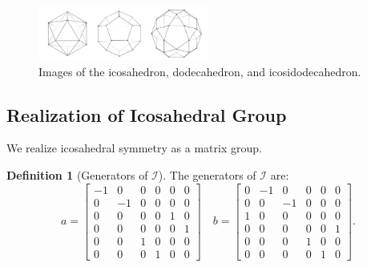 \documentclass[a4paper,10pt]{article}
\theoremstyle{plain}
\theoremstyle{definition}
\newtheorem{Definition}[Theorem]{Definition}
\theoremstyle{remark}
\begin{document}
\begin{figure}[h]
	\centering
	\captionsetup{width=0.5\textwidth}
	\includegraphics[width=0.5\textwidth]{images/ICO_DOD_IDD.jpg}
	\caption{Images of the icosahedron, dodecahedron, and icosidodecahedron.}
\end{figure}

\subsection{Realization of Icosahedral Group}
We realize icosahedral symmetry as a matrix group.
\begin{Definition}[Generators of \(\mathcal{I}\)]
    The generators of \(\mathcal{I}\) are:
    \[a = \begin{bmatrix}
    -1 & 0  & 0 & 0 & 0 & 0 \\
    0  & -1 & 0 & 0 & 0 & 0 \\
    0  & 0  & 0 & 0 & 1 & 0 \\
    0  & 0  & 0 & 0 & 0 & 1 \\
    0  & 0  & 1 & 0 & 0 & 0 \\
    0  & 0  & 0 & 1 & 0 & 0
\end{bmatrix} \quad b = \begin{bmatrix}
    0 & -1 & 0  & 0 & 0 & 0 \\
    0 & 0  & -1 & 0 & 0 & 0 \\
    1 & 0  & 0  & 0 & 0 & 0 \\
    0 & 0  & 0  & 0 & 0 & 1 \\
    0 & 0  & 0  & 1 & 0 & 0 \\
    0 & 0  & 0  & 0 & 1 & 0
\end{bmatrix}.\]
\end{Definition}
\end{document}
